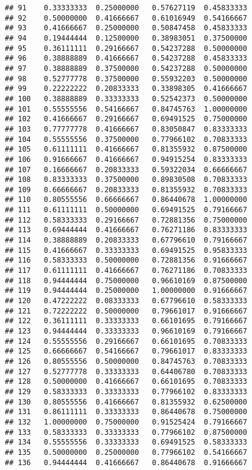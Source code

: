 \documentclass[
]{article}
\begin{document}
\begin{verbatim}
## 91    0.33333333  0.25000000   0.57627119  0.45833333
## 92    0.50000000  0.41666667   0.61016949  0.54166667
## 93    0.41666667  0.25000000   0.50847458  0.45833333
## 94    0.19444444  0.12500000   0.38983051  0.37500000
## 95    0.36111111  0.29166667   0.54237288  0.50000000
## 96    0.38888889  0.41666667   0.54237288  0.45833333
## 97    0.38888889  0.37500000   0.54237288  0.50000000
## 98    0.52777778  0.37500000   0.55932203  0.50000000
## 99    0.22222222  0.20833333   0.33898305  0.41666667
## 100   0.38888889  0.33333333   0.52542373  0.50000000
## 101   0.55555556  0.54166667   0.84745763  1.00000000
## 102   0.41666667  0.29166667   0.69491525  0.75000000
## 103   0.77777778  0.41666667   0.83050847  0.83333333
## 104   0.55555556  0.37500000   0.77966102  0.70833333
## 105   0.61111111  0.41666667   0.81355932  0.87500000
## 106   0.91666667  0.41666667   0.94915254  0.83333333
## 107   0.16666667  0.20833333   0.59322034  0.66666667
## 108   0.83333333  0.37500000   0.89830508  0.70833333
## 109   0.66666667  0.20833333   0.81355932  0.70833333
## 110   0.80555556  0.66666667   0.86440678  1.00000000
## 111   0.61111111  0.50000000   0.69491525  0.79166667
## 112   0.58333333  0.29166667   0.72881356  0.75000000
## 113   0.69444444  0.41666667   0.76271186  0.83333333
## 114   0.38888889  0.20833333   0.67796610  0.79166667
## 115   0.41666667  0.33333333   0.69491525  0.95833333
## 116   0.58333333  0.50000000   0.72881356  0.91666667
## 117   0.61111111  0.41666667   0.76271186  0.70833333
## 118   0.94444444  0.75000000   0.96610169  0.87500000
## 119   0.94444444  0.25000000   1.00000000  0.91666667
## 120   0.47222222  0.08333333   0.67796610  0.58333333
## 121   0.72222222  0.50000000   0.79661017  0.91666667
## 122   0.36111111  0.33333333   0.66101695  0.79166667
## 123   0.94444444  0.33333333   0.96610169  0.79166667
## 124   0.55555556  0.29166667   0.66101695  0.70833333
## 125   0.66666667  0.54166667   0.79661017  0.83333333
## 126   0.80555556  0.50000000   0.84745763  0.70833333
## 127   0.52777778  0.33333333   0.64406780  0.70833333
## 128   0.50000000  0.41666667   0.66101695  0.70833333
## 129   0.58333333  0.33333333   0.77966102  0.83333333
## 130   0.80555556  0.41666667   0.81355932  0.62500000
## 131   0.86111111  0.33333333   0.86440678  0.75000000
## 132   1.00000000  0.75000000   0.91525424  0.79166667
## 133   0.58333333  0.33333333   0.77966102  0.87500000
## 134   0.55555556  0.33333333   0.69491525  0.58333333
## 135   0.50000000  0.25000000   0.77966102  0.54166667
## 136   0.94444444  0.41666667   0.86440678  0.91666667

\end{verbatim}
\end{document}

